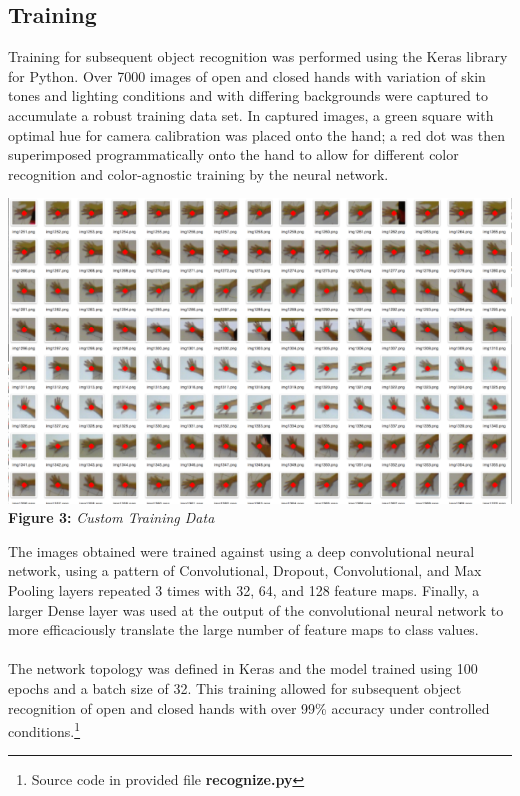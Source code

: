 \documentclass[twoside,twocolumn]{article}
\begin{document}
\subsection{Training}
Training for subsequent object recognition was performed using the Keras library for Python. Over 7000 images of open and closed hands with variation of skin tones and lighting conditions and with differing backgrounds were captured to accumulate a robust training data set. In captured images, a green square with optimal hue for camera calibration was placed onto the hand; a red dot was then superimposed programmatically onto the hand to allow for different color recognition and color-agnostic training by the neural network.

\begin{center}
\includegraphics[scale=0.25]{training_data} \\
\vspace{0.25cm}
\small{\textbf{Figure 3:} \textit{Custom Training Data}}
\end{center}

The images obtained were trained against using a deep convolutional neural network, using a pattern of Convolutional, Dropout, Convolutional, and Max Pooling layers repeated 3 times with 32, 64, and 128 feature maps. Finally, a larger Dense layer was used at the output of the convolutional neural network to more efficaciously translate the large number of feature maps to class values. \\ \\
The network topology was defined in Keras and the model trained using 100 epochs and a batch size of 32. This training allowed for subsequent object recognition of open and closed hands with over 99\% accuracy under controlled conditions.\footnote{Source code in provided file \textbf{recognize.py}}
\end{document}
